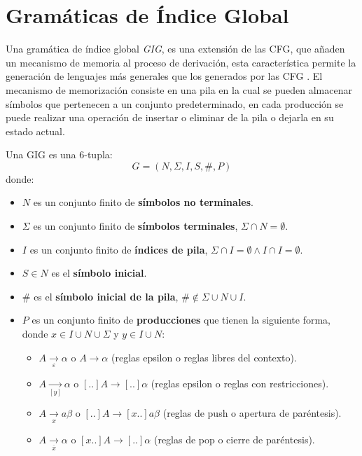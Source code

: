 \documentclass[12pt]{article}
\begin{document}
\section{Gramáticas de Índice Global}

Una gramática de índice global \textit{GIG}, es una extensión de las CFG, que añaden un mecanismo
de memoria al proceso de derivación, esta característica permite la generación de lenguajes más generales que los generados
por las CFG \cite{globalIndexLanguages}.
El mecanismo de memorización consiste en una pila en la cual se pueden almacenar símbolos que pertenecen a un conjunto predeterminado,
en cada producción se puede realizar una operación de insertar o eliminar de la pila o dejarla en su estado actual.

Una GIG es una 6-tupla:
$$
    G = (N, \Sigma, I, S, \#, P)
$$
donde:

\begin{itemize}
    \item $N$ es un conjunto finito de \textbf{símbolos no terminales}.
    \item \( \Sigma \) es un conjunto finito de \textbf{símbolos terminales}, $\Sigma \cap N=\emptyset$.
    \item $I$ es un conjunto finito de \textbf{índices de pila}, $\Sigma \cap I=\emptyset \wedge I \cap I=\emptyset$.
    \item $S\in N$ es el \textbf{símbolo inicial}.
    \item $\#$ es el \textbf{símbolo inicial de la pila}, $\# \notin \Sigma \cup N \cup I$.
    \item $P$ es un conjunto finito de \textbf{producciones} que tienen la siguiente forma, donde $x\in I\cup N\cup \Sigma$ y $y\in I\cup N$:
          \begin{itemize}
              \item $A \underset{\varepsilon}{\to} \alpha$ o $A \to \alpha$ (reglas epsilon o reglas libres del contexto).
              \item $A \underset{[y]}{\to}  \alpha$ o $[..]A \to [..]\alpha$ (reglas epsilon o reglas con restricciones).
              \item $A \underset{x}{\to} a \beta$ o $[..]A \to  [x..]a\beta$ (reglas de push o apertura de paréntesis).
              \item $A \underset{\overline{x}}{\to} \alpha$ o $[x..]A \to [..]\alpha$ (reglas de pop o cierre de paréntesis).
          \end{itemize}
\end{itemize}
\end{document}
